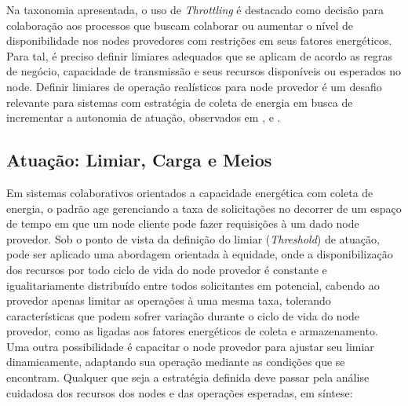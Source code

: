  Na taxonomia apresentada, o uso de \textit{Throttling} é destacado como decisão para colaboração aos processos que buscam colaborar ou aumentar o nível de disponibilidade nos nodes provedores com restrições em seus fatores energéticos. Para tal, é preciso definir limiares adequados que se aplicam de acordo as regras de negócio, capacidade de transmissão e seus recursos disponíveis ou esperados no node. Definir limiares de operação realísticos para node provedor é um desafio relevante para sistemas com estratégia de coleta de energia em busca de incrementar a autonomia de atuação, observados em \cite{khairnar_discrete-rate_2015}, \cite{liu_energy_2016} e \cite{zhang_toward_2018}.

\subsection{Atuação: Limiar, Carga e Meios}
Em sistemas colaborativos orientados a capacidade energética com coleta de energia, o padrão age gerenciando a taxa de solicitações no decorrer de um espaço de tempo em que um node cliente pode fazer requisições à um dado node provedor. Sob o ponto de vista da definição do limiar (\textit{Threshold}) de atuação, pode ser aplicado uma abordagem orientada à equidade, onde a disponibilização dos recursos por todo ciclo de vida do node provedor é constante e igualitariamente distribuído entre todos solicitantes em potencial, cabendo ao provedor apenas limitar as operações à uma mesma taxa, tolerando características que podem sofrer variação durante o ciclo de vida do node provedor, como as ligadas aos fatores energéticos de coleta e armazenamento.  Uma outra possibilidade é capacitar o node provedor para ajustar seu limiar dinamicamente, adaptando sua operação mediante as condições que se encontram. Qualquer que seja a estratégia definida deve passar pela análise cuidadosa dos recursos dos nodes  e das operações esperadas, em síntese: 


